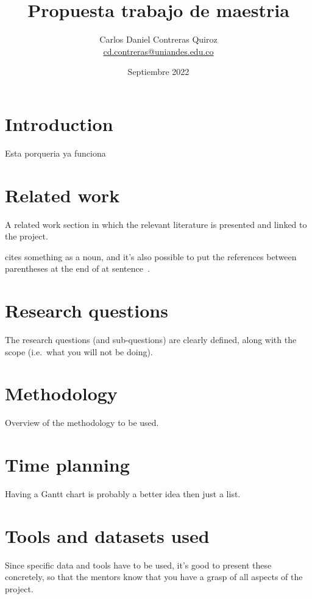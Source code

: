 \documentclass[a4paper,11pt]{scrartcl}
\title{Propuesta trabajo de maestria}
\author{Carlos Daniel Contreras Quiroz\\ \url{cd.contreras@uniandes.edu.co}}
\date{Septiembre 2022}
\newcommand{\ie}{i.e.}
\begin{document}
	
	\maketitle
	
	
	\section{Introduction}
Esta porqueria ya funciona
	
	\section{Related work}
	A related work section in which the relevant literature is presented and linked to the project.
	
	\citet{Delaunay34} cites something as a noun, and it's also possible to put the references between parentheses at the end of at sentence~\citep{Voronoi08}.
	
	\section{Research questions}
	The research questions (and sub-questions) are clearly defined, along with the scope (\ie\ what you will not be doing).
	
	
	\section{Methodology}
	Overview of the methodology to be used.
	
	\section{Time planning}
	Having a Gantt chart is probably a better idea then just a list.
	
	\section{Tools and datasets used}
	Since specific data and tools have to be used, it’s good to present these concretely, so that the mentors know that you have a grasp of all aspects of the project.
	
	
	
	
\end{document}
